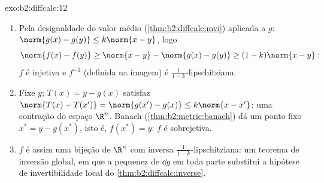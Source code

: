 \begin{solution}{exo:b2:diffcalc:12}
\begin{enumerate}
  \item Pela desigualdade do valor médio
        (\cref{thm:b2:diffcalc:mvi}) aplicada a $g$:
        $\norm{g(x) - g(y)} \leq k\norm{x-y}$, logo
        \[
        \norm{f(x) - f(y)} \geq \norm{x - y} - \norm{g(x) -
        g(y)} \geq (1 - k)\norm{x - y} :
        \]
        $f$ é injetiva e $f^{-1}$ (definida na imagem) é
        $\frac{1}{1-k}$-lipschitziana.
  \item Fixe $y$; $T(x) = y - g(x)$ satisfaz $\norm{T(x) -
        T(x')} = \norm{g(x') - g(x)} \leq k\norm{x - x'}$: uma
        contração do espaço  $\R^n$. Banach
        (\cref{thm:b2:metric:banach}) dá um ponto fixo $x^*
        = y - g(x^*)$, isto é, $f(x^*) = y$: $f$ é sobrejetiva.
  \item $f$ é assim uma bijeção de $\R^n$ com
        inversa $\frac{1}{1-k}$-lipschitziana: um teorema de inversão
        global, em que a pequenez de $\dd g$ em toda parte
        substitui a hipótese de invertibilidade local do
        \cref{thm:b2:diffcalc:inverse}.
\end{enumerate}
\end{solution}

